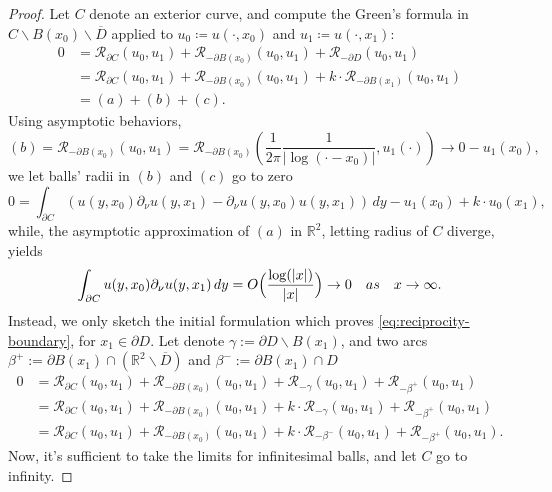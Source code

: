 \documentclass[10pt, a4paper, twoside, openright]{book}
\theoremstyle{definition}
\theoremstyle{plain}
\theoremstyle{plain}
\theoremstyle{plain}
\theoremstyle{plain}
\theoremstyle{plain}
\theoremstyle{plain}
\theoremstyle{plain}
\theoremstyle{plain}
\begin{document}
\begin{proof}
 Let $C$ denote an exterior curve, and compute the Green's formula in $C \backslash B(x_0) \backslash \overline{D}$ applied to $u_0\coloneqq u(\cdot,x_0)$ and $u_1\coloneqq u(\cdot,x_1)$:
 \begin{align*}
 0 &= \mathcal{R}_{\partial C}(u_0,u_1)+\mathcal{R}_{-\partial B(x_0)}(u_0,u_1)+\mathcal{R}_{-\partial D}(u_0,u_1) \\
   &= \mathcal{R}_{\partial C}(u_0,u_1)+\mathcal{R}_{-\partial B(x_0)}(u_0,u_1) + k \cdot \mathcal{R}_{-\partial B(x_1)}(u_0,u_1)\\
   &= (a) + (b) + (c).
 \end{align*}
 Using asymptotic behaviors,
 \begin{equation*}
  (b) = \mathcal{R}_{-\partial B(x_0)}(u_0,u_1) = \mathcal{R}_{-\partial B(x_0)}(\frac{1}{2\pi}\frac{1}{| \log(\cdot - x_0) |},u_1(\cdot))\to 0 - u_1(x_0),
 \end{equation*}
 we let balls' radii in $(b)$ and $(c)$ go to zero
 \begin{equation*}
 0 = \int_{\partial C}(u(y,x_0)\partial_\nu u(y,x_1) - \partial_\nu u(y,x_0)u(y,x_1))\, dy - u_1(x_0) + k \cdot u_0(x_1),
 \end{equation*}
 while, the asymptotic approximation of $(a)$ in $\mathbb{R}^2$, letting radius of $C$ diverge, yields
 \begin{equation*}
  \int_{\partial C} u(y,x_0)\partial_\nu u(y,x_1) \, dy = O\Bigl(\frac{\log(|x|)}{|x|}\Bigr)\to 0\quad as \quad x\to \infty.
 \end{equation*}
 Instead, we only sketch the initial formulation  which proves \eqref{eq:reciprocity-boundary}, for $x_1\in\partial D$. Let denote  
 $\gamma := \partial D\backslash B(x_1)$, and two arcs $\beta^+ := \partial B(x_1) \cap (\mathbb{R}^2\backslash\overline{D})$ and $\beta^- := \partial B(x_1) \cap D$
 \begin{align*}
 0 &= \mathcal{R}_{\partial C}(u_0,u_1)+\mathcal{R}_{-\partial B(x_0)}(u_0,u_1)+\mathcal{R}_{- \gamma}(u_0,u_1)+\mathcal{R}_{- \beta^+}(u_0,u_1)\\
 &= \mathcal{R}_{\partial C}(u_0,u_1)+\mathcal{R}_{-\partial B(x_0)}(u_0,u_1)+k\cdot \mathcal{R}_{- \gamma}(u_0,u_1)+\mathcal{R}_{- \beta^+}(u_0,u_1)\\
 &= \mathcal{R}_{\partial C}(u_0,u_1)+\mathcal{R}_{-\partial B(x_0)}(u_0,u_1)+k\cdot \mathcal{R}_{- \beta^-}(u_0,u_1)+\mathcal{R}_{- \beta^+}(u_0,u_1).
 \end{align*}
 Now, it's sufficient to take the limits for infinitesimal balls, and let $C$ go to infinity.
\end{proof}
\end{document}
